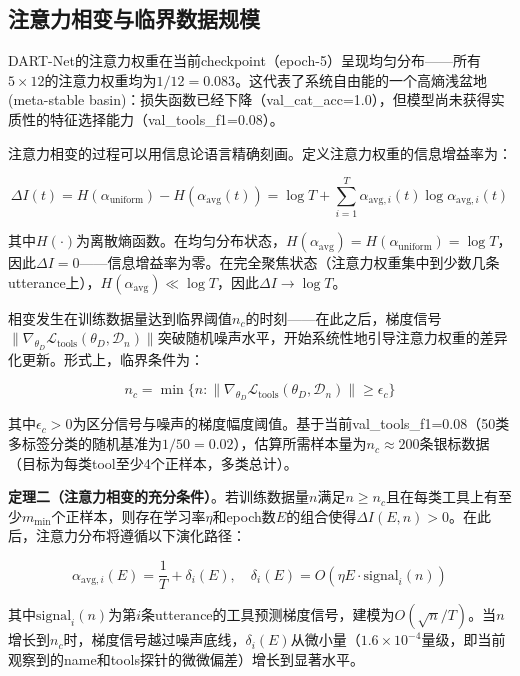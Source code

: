\documentclass[twocolumn,10.5pt]{ctexart}
\def\cD{\mathcal{D}}
\def\cL{\mathcal{L}}
\begin{document}
\subsection{注意力相变与临界数据规模}

DART-Net的注意力权重在当前checkpoint（epoch-5）呈现均匀分布——所有$5 \times 12$的注意力权重均为$1/12 = 0.083$。这代表了系统自由能的一个高熵浅盆地(meta-stable basin)：损失函数已经下降（val\_cat\_acc=1.0），但模型尚未获得实质性的特征选择能力（val\_tools\_f1=0.08）。

注意力相变的过程可以用信息论语言精确刻画。定义注意力权重的信息增益率为：

\begin{equation}
\Delta I(t) = H(\alpha_{\text{uniform}}) - H(\alpha_{\text{avg}}(t)) = \log T + \sum_{i=1}^T \alpha_{\text{avg},i}(t) \log \alpha_{\text{avg},i}(t)
\label{eq:info_gain}
\end{equation}

其中$H(\cdot)$为离散熵函数。在均匀分布状态，$H(\alpha_{\text{avg}}) = H(\alpha_{\text{uniform}}) = \log T$，因此$\Delta I = 0$——信息增益率为零。在完全聚焦状态（注意力权重集中到少数几条utterance上），$H(\alpha_{\text{avg}}) \ll \log T$，因此$\Delta I \to \log T$。

相变发生在训练数据量达到临界阈值$n_c$的时刻——在此之后，梯度信号$\|\nabla_{\theta_D} \cL_{\text{tools}}(\theta_D, \cD_{n})\|$突破随机噪声水平，开始系统性地引导注意力权重的差异化更新。形式上，临界条件为：

\begin{equation}
n_c = \min\{n : \|\nabla_{\theta_D} \cL_{\text{tools}}(\theta_D, \cD_{n})\| \geq \epsilon_c\}
\label{eq:n_critical}
\end{equation}

其中$\epsilon_c > 0$为区分信号与噪声的梯度幅度阈值。基于当前val\_tools\_f1=0.08（50类多标签分类的随机基准为$1/50 = 0.02$），估算所需样本量为$n_c \approx 200$条银标数据（目标为每类tool至少4个正样本，多类总计）。

\textbf{定理二（注意力相变的充分条件）}。若训练数据量$n$满足$n \geq n_c$且在每类工具上有至少$m_{\min}$个正样本，则存在学习率$\eta$和epoch数$E$的组合使得$\Delta I(E, n) > 0$。在此后，注意力分布将遵循以下演化路径：

\begin{equation}
\alpha_{\text{avg},i}(E) = \frac{1}{T} + \delta_i(E), \quad \delta_i(E) = O(\eta E \cdot \text{signal}_i(n))
\label{eq:phase_transition}
\end{equation}

其中$\text{signal}_i(n)$为第$i$条utterance的工具预测梯度信号，建模为$O(\sqrt{n}/T)$。当$n$增长到$n_c$时，梯度信号越过噪声底线，$\delta_i(E)$从微小量（$1.6\times10^{-4}$量级，即当前观察到的name和tools探针的微微偏差）增长到显著水平。
\end{document}
